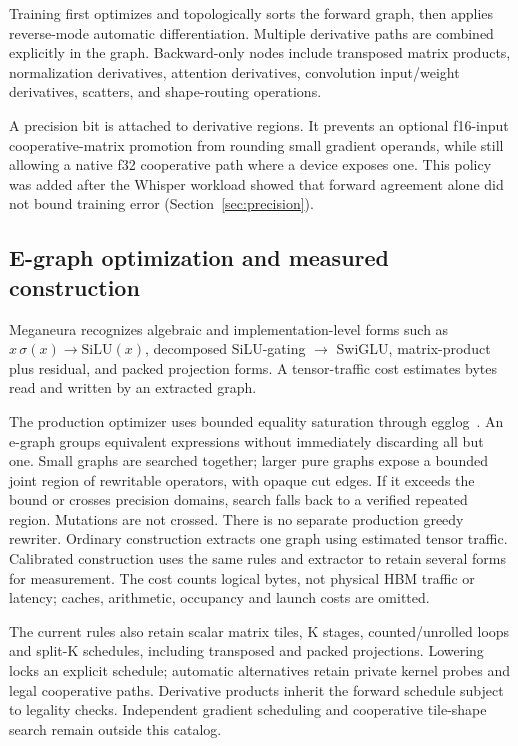 \documentclass[10pt,twocolumn]{article}
\newcommand{\system}{Meganeura}
\begin{document}
Training first optimizes and topologically sorts the forward graph, then
applies reverse-mode automatic differentiation. Multiple derivative paths are
combined explicitly in the graph. Backward-only nodes include transposed
matrix products, normalization derivatives, attention derivatives,
convolution input/weight derivatives, scatters, and shape-routing operations.

A precision bit is attached to derivative regions. It prevents an optional
f16-input cooperative-matrix promotion from rounding small gradient operands,
while still allowing a native f32 cooperative path where a device exposes
one. This policy was added after the Whisper workload showed that forward
agreement alone did not bound training error (Section~\ref{sec:precision}).

\subsection{E-graph optimization and measured construction}

\system{} recognizes algebraic and implementation-level forms such as
$x\,\sigma(x)\rightarrow\mathrm{SiLU}(x)$, decomposed
SiLU-gating $\rightarrow$ SwiGLU, matrix-product plus residual, and packed
projection forms. A tensor-traffic cost estimates bytes read and written by an
extracted graph.

The production optimizer uses bounded equality saturation through
egglog~\cite{zhang2023egglog}. An e-graph groups equivalent expressions
without immediately discarding all but one. Small graphs are searched together;
larger pure graphs expose a bounded joint region of rewritable operators,
with opaque cut edges. If it exceeds the bound or crosses precision domains,
search falls back to a verified repeated region. Mutations are not crossed.
There is no separate production greedy
rewriter. Ordinary construction extracts one graph using estimated tensor
traffic. Calibrated construction uses the same rules and extractor to retain
several forms for measurement. The cost counts logical bytes, not physical HBM
traffic or latency; caches, arithmetic, occupancy and launch costs are omitted.

The current rules also retain scalar matrix tiles, K stages, counted/unrolled
loops and split-K schedules, including transposed and packed projections.
Lowering locks an explicit schedule; automatic alternatives retain private
kernel probes and legal cooperative paths. Derivative products inherit the
forward schedule subject to legality checks. Independent gradient scheduling
and cooperative tile-shape search remain outside this catalog.
\end{document}
